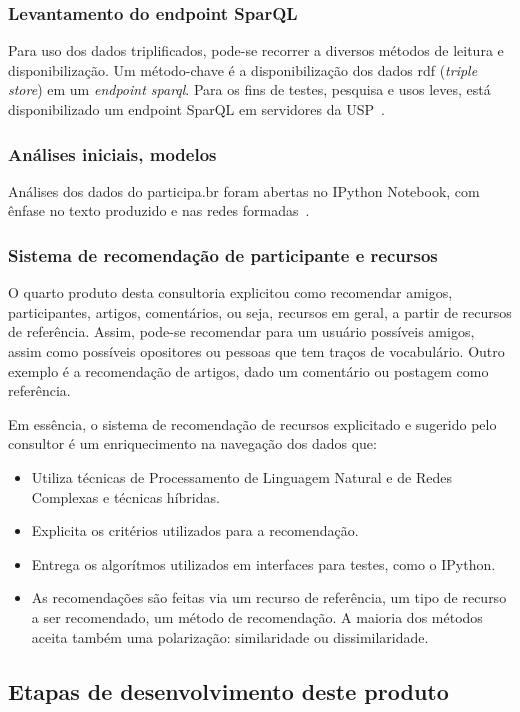 \documentclass[12pt]{article}
\begin{document}
\subsubsection{Levantamento do endpoint SparQL}\label{sec:sfoo}
Para uso dos dados triplificados, pode-se recorrer a diversos métodos de leitura e disponibilização. Um método-chave é a disponibilização dos dados rdf (\emph{triple store}) em um \emph{endpoint sparql}. Para os fins de testes, pesquisa e usos leves, está disponibilizado um endpoint SparQL em servidores da USP~\cite{endpoint}.
\subsubsection{Análises iniciais, modelos}
Análises dos dados do participa.br foram abertas no IPython Notebook, com ênfase no texto produzido e nas redes formadas~\cite{repoProd3}.
\subsubsection{Sistema de recomendação de participante e recursos}
O quarto produto desta consultoria explicitou como recomendar amigos, participantes, artigos, comentários, ou seja, recursos em geral, a partir de recursos de referência. Assim, pode-se recomendar para um usuário possíveis amigos, assim como possíveis opositores ou pessoas que tem traços de vocabulário. Outro exemplo é a recomendação de artigos, dado um comentário ou postagem como referência.

Em essência, o sistema de recomendação de recursos explicitado e sugerido pelo consultor é um enriquecimento na navegação dos dados que:
\begin{itemize}
    \item Utiliza técnicas de Processamento de Linguagem Natural e de Redes Complexas e técnicas híbridas.
    \item Explicita os critérios utilizados para a recomendação.
    \item Entrega os algorítmos utilizados em interfaces para testes, como o IPython.
    \item As recomendações são feitas via um recurso de referência, um tipo de recurso a ser recomendado, um método de recomendação. A maioria dos métodos aceita também uma polarização: similaridade ou dissimilaridade.
\end{itemize}

\subsection{Etapas de desenvolvimento deste produto}
\end{document}
